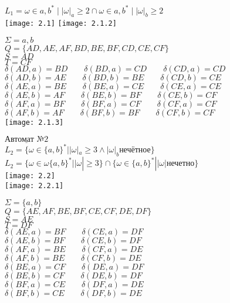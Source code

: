 \documentclass[14pt]{extreport}
\begin{document}
$L_1 = {\omega \in {a, b}^* \mid |\omega|_a \geq 2} \cap {\omega \in {a, b}^* \mid |\omega|_b \geq 2}$\\

\texttt{[image: 2.1]}
\texttt{[image: 2.1.2]}

$\Sigma = {a, b} $\\ 
$Q = \lbrace AD, AE, AF, BD, BE, BF, CD, CE, CF \rbrace $\\ 
$S = AD $\\ 
$T = CF $\\ 
$\delta(AD, a) = BD \qquad \delta(BD, a) = CD \qquad \delta(CD, a) = CD$\\
$\delta(AD, b) = AE \qquad \delta(BD, b) = BE \qquad \delta(CD, b) = CE$\\ 
$\delta(AE, a) = BE \qquad \delta(BE, a) = CE \qquad \delta(CE, a) = CE$\\
$\delta(AE, b) = AF \qquad \delta(BE, b) = BF \qquad \delta(CE, b) = CF $\\
$\delta(AF, a) = BF \qquad \delta(BF, a) = CF \qquad \delta(CF, a) = CF $\\
$\delta(AF, b) = AF \qquad \delta(BF, b) = BF \qquad \delta(CF, b) = CF$\\

\texttt{[image: 2.1.3]}


$\underline{\text{Автомат №2}}$\\
$L_2 = \lbrace \omega \in \lbrace a,b \rbrace ^* ||\omega|_a \geq 3 \wedge |\omega|_b \text{нечётное} \rbrace $\\

$L_2 = \lbrace \omega \in \omega \lbrace a, b \rbrace ^* ||\omega| \geq 3 \rbrace \cap \lbrace \omega \in \lbrace a, b \rbrace ^* ||\omega| \text{нечетно} \rbrace$\\

\texttt{[image: 2.2]}\\
\texttt{[image: 2.2.1]}

$\Sigma = \lbrace a, b \rbrace $\\
$Q = \lbrace AE, AF, BE, BF, CE, CF, DE, DF \rbrace $\\
$S = AE$\\
$T = DF$\\
$\delta(AE, a) = BF \qquad \delta(CE, a) = DF$ \\ 
$\delta(AE, b) = BF \qquad \delta(CE, b) = DF$ \\
$\delta(AF, a) = BE \qquad \delta(CF, a) = DE$ \\
$\delta(AF, b) = BE \qquad \delta(CF, b) = DE$ \\
$\delta(BE, a) = CF \qquad \delta(DE, a) = DF$ \\
$\delta(BE, b) = CF \qquad \delta(DE, b) = DF$ \\
$\delta(BF, a) = CE \qquad \delta(DF, a) = DE$ \\
$\delta(BF, b) = CE \qquad \delta(DF, b) = DE$ \\
\end{document}
